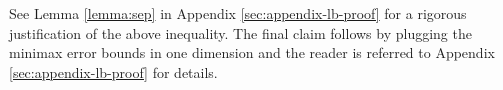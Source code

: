 See Lemma \ref{lemma:sep} in Appendix \ref{sec:appendix-lb-proof} for a rigorous justification of the above inequality. 
The final claim follows by plugging the minimax error bounds in one dimension and the reader is referred to Appendix \ref{sec:appendix-lb-proof} for details.
\fi



% 



